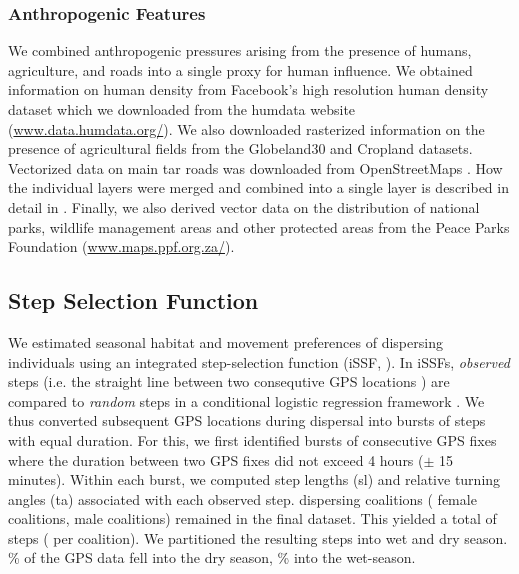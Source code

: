 \documentclass[abstract=on,10pt,a4paper,bibliography=totocnumbered]{article}
\newcommand{\inputy}[1]{\unskip}
\begin{document}
\subsubsection{Anthropogenic Features}
We combined anthropogenic pressures arising from the presence of humans,
agriculture, and roads into a single proxy for human influence. We obtained
information on human density from Facebook's high resolution human density
dataset \citep{Tiecke.2017} which we downloaded from the humdata website
(\url{www.data.humdata.org/}). We also downloaded rasterized information on the
presence of agricultural fields from the Globeland30 \citep{Chen.2015} and
Cropland \citep{Xiong.2017} datasets. Vectorized data on main tar roads was
downloaded from OpenStreetMaps \citep{OpenStreetMapContributors.2017}. How the
individual layers were merged and combined into a single layer is described in
detail in \cite{Hofmann.2021}. Finally, we also derived vector data on the
distribution of national parks, wildlife management areas and other protected
areas from the Peace Parks Foundation (\url{www.maps.ppf.org.za/}).

\subsection{Step Selection Function}
We estimated seasonal habitat and movement preferences of dispersing individuals
using an integrated step-selection function (iSSF, \citealp{Fortin.2005,
Avgar.2016}). In iSSFs, \textit{observed} steps (i.e. the straight line between
two consequtive GPS locations \citep{Turchin.1998}) are compared to
\textit{random} steps in a conditional logistic regression framework
\citep{Fortin.2005, Thurfjell.2014, Muff.2020, Fieberg.2021}. We thus converted
subsequent GPS locations during dispersal into bursts of steps with equal
duration. For this, we first identified bursts of consecutive GPS fixes where
the duration between two GPS fixes did not exceed 4 hours (\(\pm\) 15 minutes).
Within each burst, we computed step lengths (sl) and relative turning angles
(ta) associated with each observed step. \inputy{99_GeneralMetrics/SSFTotal}
dispersing coalitions (\inputy{99_GeneralMetrics/SSFFemales} female coalitions,
\inputy{99_GeneralMetrics/SSFMales} male coalitions) remained in the final
dataset. This yielded a total of \inputy{99_GeneralMetrics/StepsTotal} steps
(\inputy{99_GeneralMetrics/StepsMeanSD} per coalition). We partitioned the
resulting steps into wet and dry season.
\inputy{99_GeneralMetrics/PercentageStepsDry}\% of the GPS data fell into the
dry season, \inputy{99_GeneralMetrics/PercentageStepsWet}\% into the wet-season.
\end{document}
